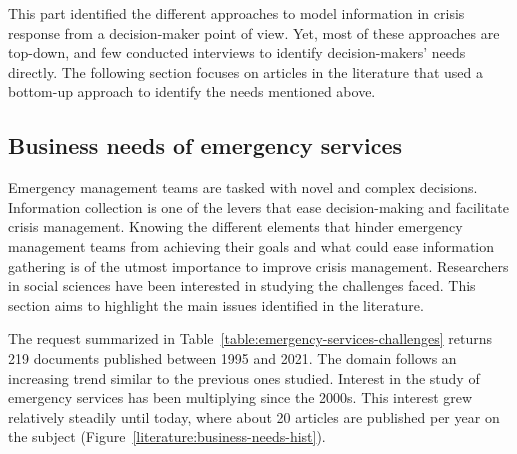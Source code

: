 This part identified the different approaches to model information in crisis response from a decision-maker point of view.
Yet, most of these approaches are top-down, and few conducted interviews to identify decision-makers' needs directly.
The following section focuses on articles in the literature that used a bottom-up approach to identify the needs mentioned above.

\subsection{Business needs of emergency services}
Emergency management teams are tasked with novel and complex decisions.
Information collection is one of the levers that ease decision-making and facilitate crisis management.
Knowing the different elements that hinder emergency management teams from achieving their goals and what could ease information gathering is of the utmost importance to improve crisis management.
Researchers in social sciences have been interested in studying the challenges faced.
This section aims to highlight the main issues identified in the literature.

The request summarized in Table~\ref{table:emergency-services-challenges} returns 219 documents published between 1995 and 2021.
The domain follows an increasing trend similar to the previous ones studied.
Interest in the study of emergency services has been multiplying since the 2000s.
This interest grew relatively steadily until today, where about 20 articles are published per year on the subject (Figure~\ref{literature:business-needs-hist}).

